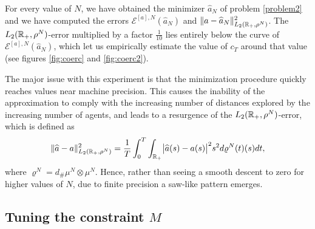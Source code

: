 For every value of $N$, we have obtained the minimizer $\widehat{a}_N$ of problem \eqref{problem2} and we have computed the errors $\mathcal{E}^{[a],N}(\widehat{a}_N)$ and $\|a-\widehat{a}_N\|^2_{L_2(\mathbb{R}_+,\rho^N)}$. The $L_2(\mathbb{R}_+,\rho^N)$-error multiplied by a factor $\frac{1}{10}$ lies entirely below the curve of $\mathcal{E}^{[a],N}(\widehat{a}_N)$, which let us empirically estimate the value of $c_T$ around that value (see figures \ref{fig:coerc} and \ref{fig:coerc2}).

The major issue with this experiment is that the minimization procedure quickly reaches values near machine precision. This causes the inability of the approximation to comply with the increasing number of distances explored by the increasing number of agents, and leads to a resurgence of the $L_2(\mathbb{R}_+,\rho^N)$-error, which is defined as
\begin{align}
	\|\widehat a-a\|^2_{L_2(\mathbb{R}_+,\rho^N)} = \frac{1}{T}\int_0^T\int_{\mathbb{R}_+}\bigl|\widehat a(s)-a(s)\bigr|^2 s^2 d\varrho^N(t)(s) dt,
\end{align}
where $\varrho^N = d_\# \mu^N \otimes \mu^N$.
Hence, rather than seeing a smooth descent to zero for higher values of $N$, due to finite precision a saw-like pattern emerges. 

\subsection{Tuning the constraint $M$}

